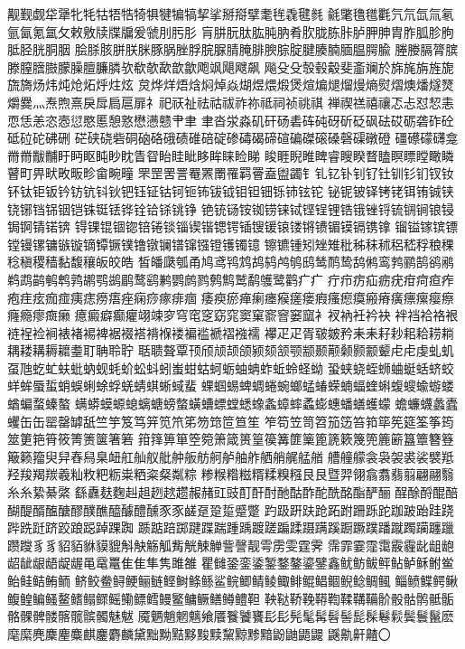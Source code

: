 觏觐觑牮犟牝牦牯牾牿犄犋犍犏犒挈挲掰搿擘耄毪毳毽毵
毹氅氇氆氍氕氘氙氚氡氩氤氪氲攵敕敫牍牒牖爰虢刖肟肜
肓肼朊肽肱肫肭肴肷胧胨胩胪胛胂胄胙胍胗朐胝胫胱胴胭
脍脎胲胼朕脒豚脶脞脬脘脲腈腌腓腴腙腚腱腠腩腼腽腭腧
塍媵膈膂膑滕膣膪臌朦臊膻臁膦欤欷欹歃歆歙飑飒飓飕飙
飚⽎殳彀毂觳斐齑斓於旆旄旃旌旎旒旖炀炜炖炝炻烀炷炫
炱烨烊焐焓焖焯焱煳煜煨煅煲煊煸煺熘熳熵熨熠燠燔燧燹
爝爨灬焘煦熹戾戽扃扈扉礻祀祆祉祛祜祓祚祢祗祠祯祧祺
禅禊禚禧禳忑忐怼恝恚恧恁恙恣悫愆愍慝憩憝懋懑戆肀⾀
聿沓泶淼矶矸砀砉砗砘砑斫砭砜砝砹砺砻砟砼砥砬砣砩硎
硭硖硗砦硐硇硌硪碛碓碚碇碜碡碣碲碹碥磔磙磉磬磲礅磴
礓礤礞礴龛⿋黹黻黼盱眄眍盹眇眈眚眢眙眭眦眵眸睐睑睇
睃睚睨睢睥睿瞍睽瞀瞌瞑瞟瞠瞰瞵瞽町畀畎畋畈畛畲畹疃
罘罡罟詈罨罴罱罹羁罾盍盥蠲钅钆钇钋钊钌钍钏钐钔钗钕
钚钛钜钣钤钫钪钭钬钯钰钲钴钶钷钸钹钺钼钽钿铄铈铉铊
铋铌铍铎铐铑铒铕铖铗铙铘铛铞铟铠铢铤铥铧铨铪铩铫铮
铯铳铴铵铷铹铼铽铿锃锂锆锇锉锊锍锎锏锒锓锔锕锖锘锛
锝锞锟锢锪锫锩锬锱锲锴锶锷锸锼锾锿镂锵镄镅镆镉镌镎
镏镒镓镔镖镗镘镙镛镞镟镝镡镢镤镥镦镧镨镩镪镫镬镯镱
镲镳锺矧矬雉秕秭秣秫稆嵇稃稂稞稔稹稷穑黏馥穰皈皎皓
皙皤瓞瓠甬鸠鸢鸨鸩鸪鸫鸬鸲鸱鸶鸸鸷鸹鸺鸾鹁鹂鹄鹆鹇
鹈鹉鹋鹌鹎鹑鹕鹗鹚鹛鹜鹞鹣鹦鹧鹨鹩鹪鹫鹬鹱鹭鹳⽧疒
疔疖疠疝疬疣疳疴疸痄疱疰痃痂痖痍痣痨痦痤痫痧瘃痱痼
痿瘐瘀瘅瘌瘗瘊瘥瘘瘕瘙瘛瘼瘢瘠癀瘭瘰瘿瘵癃瘾瘳癍癞
癔癜癖癫癯翊竦穸穹窀窆窈窕窦窠窬窨窭窳衤衩衲衽衿袂
袢裆袷袼裉裢裎裣裥裱褚裼裨裾裰褡褙褓褛褊褴褫褶襁襦
襻⽦疋胥皲皴矜⽾耒耔耖耜耠耢耥耦耧耩耨耱耋耵聃聆聍
聒聩聱覃顸颀颃颉颌颍颏颔颚颛颞颟颡颢颥颦⾌虍虔虬虮
虿虺虼虻蚨蚍蚋蚬蚝蚧蚣蚪蚓蚩蚶蛄蚵蛎蚰蚺蚱蚯蛉蛏蚴
蛩蛱蛲蛭蛳蛐蜓蛞蛴蛟蛘蛑蜃蜇蛸蜈蜊蜍蜉蜣蜻蜞蜥蜮蜚
蜾蝈蜴蜱蜩蜷蜿螂蜢蝽蝾蝻蝠蝰蝌蝮螋蝓蝣蝼蝤蝙蝥螓螯
螨蟒蟆螈螅螭螗螃螫蟥螬螵螳蟋蟓螽蟑蟀蟊蟛蟪蟠蟮蠖蠓
蟾蠊蠛蠡蠹蠼⽸缶罂罄罅舐竺竽笈笃笄笕笊笫笏筇笸笪笙
笮笱笠笥笤笳笾笞筘筚筅筵筌筝筠筮筻筢筲筱箐箦箧箸箬
箝箨箅箪箜箢箫箴篑篁篌篝篚篥篦篪簌篾篼簏簖簋簟簪簦
簸籁籀臾舁舂舄臬衄舡舢舣舭舯舨舫舸舻舳舴舾艄艉艋艏
艚艟艨衾袅袈裘裟襞羝羟羧羯羰羲籼敉粑粝粜粞粢粲粼粽
糁糇糌糍糈糅糗糨⾉艮暨羿翎翕翥翡翦翩翮翳⽷糸絷綦綮
繇纛麸麴赳趄趔趑趱赧赭豇豉酊酐酎酏酤酢酡酰酩酯酽酾
酲酴酹醌醅醐醍醑醢醣醪醭醮醯醵醴醺⾗豕鹾趸跫踅蹙蹩
趵趿趼趺跄跖跗跚跞跎跏跛跆跬跷跸跣跹跻跤踉跽踔踝踟
踬踮踣踯踺蹀踹踵踽踱蹉蹁蹂蹑蹒蹊蹰蹶蹼蹯蹴躅躏躔躐
躜躞⾘豸貂貊貅貘貔斛觖觞觚觜觥觫觯訾謦靓雩雳雯霆霁
霈霏霎霪霭霰霾龀龃龅龆龇龈龉龊龌黾鼋鼍⾫隹隼隽雎雒
瞿雠銎銮鋈錾鍪鏊鎏鐾鑫鱿鲂鲅鲆鲇鲈稣鲋鲎鲐鲑鲒鲔鲕
鲚鲛鲞鲟鲠鲡鲢鲣鲥鲦鲧鲨鲩鲫鲭鲮鲰鲱鲲鲳鲴鲵鲶鲷鲺
鲻鲼鲽鳄鳅鳆鳇鳊鳋鳌鳍鳎鳏鳐鳓鳔鳕鳗鳘鳙鳜鳝鳟鳢靼
鞅鞑鞒鞔鞯鞫鞣鞲鞴骱骰骷鹘骶骺骼髁髀髅髂髋髌髑魅魃
魇魉魈魍魑飨餍餮饕饔⾽髟髡髦髯髫髻髭髹鬈鬏鬓鬟鬣麽
麾縻麂麇麈麋麒鏖麝麟黛黜黝黠黟黢黩黧黥黪黯鼢鼬鼯鼹
鼷鼽鼾齄〇


